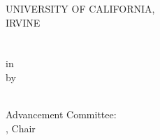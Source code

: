 \documentclass[onecolumn]{article}
\newcommand{\thesistitlepage}
{
	\vspace*{0.5in}
	\thispagestyle{empty}
	\begin{center}
		UNIVERSITY OF CALIFORNIA, \\
		IRVINE \\
		\vspace{0.4in}
		\Thesistitle \\
		\vspace{0.4in}
		\MakeUppercase\Degreename \\
		\vspace{0.15in}
		in \Degreefield \\
		\vspace{0.4in}
		by \\
		\vspace{0.4in}
		\Authorname \\
	\end{center}
	\vspace{3in}
	\begin{flushright}
		Advancement Committee: \\
		\Committeechair, Chair \\
		\Othercommitteemembers \\
	\end{flushright}
	\vfill
	\clearpage
}
\begin{document}


\thesistitlepage
\newpage

\tableofcontents

\newpage



%

\graphicspath{{Background/}}



\graphicspath{{ModelDevelopment/}}



\graphicspath{{Results/LocalStructuring/}}



\graphicspath{{Results/Electrostatics/}}



\graphicspath{{Results/SimultaneousBinding/}}



\graphicspath{{Results/SurfaceEffects/}}



\graphicspath{{Timeline/}}




%







\end{document}
